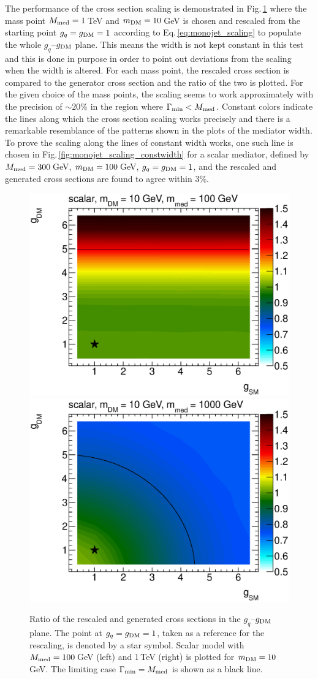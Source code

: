 The performance of the cross section scaling is demonstrated in Fig.\,\ref{fig:monojet_scaling} %
where the mass point $M_{\rm{med}}=1$\,TeV and $m_{\rm{DM}}=10$\,GeV is chosen
and rescaled from the starting point $g_q=g_{\rm{DM}}=1$ according to Eq.\,\ref{eq:monojet_scaling} to populate the whole $g_q$--$g_{\rm{DM}}$ plane. This means the width is not kept constant in this test and this is done in purpose in order to point out deviations from the scaling when the width is altered. For each mass point, the rescaled cross section is compared to the generator cross section and the ratio of the two is plotted.
For the given choice of the mass points, the scaling seems to work approximately with the precision of $\sim20\%$ in the region where $\Gamma_{\rm{min}}<M_{\rm{med}}$.
Constant colors indicate the lines along which the cross section scaling works precisely and there is a remarkable resemblance of the patterns shown in the plots of the mediator width. To prove the scaling along the lines of constant width works, one such line is chosen in Fig.\,\ref{fig:monojet_scaling_constwidth} for a scalar mediator, defined by $M_{\rm{med}}=300$\,GeV, $m_{\rm{DM}}=100$\,GeV, $g_q=g_{\rm{DM}}=1$, and the rescaled and generated cross sections are found to agree within 3\%.


\begin{figure}
\centering
\includegraphics[width=0.45\linewidth]{figures/monojet/scaling_S_10_100.eps}
\includegraphics[width=0.45\linewidth]{figures/monojet/scaling_S_10_1000.eps}\\
\caption{Ratio of the rescaled and generated cross sections in the $g_q$--$g_{\rm{DM}}$ plane. The point at $g_q=g_{\rm{DM}}=1$, taken as a reference for the rescaling, is denoted by a star symbol.
Scalar model with $M_{\rm{med}}=100$\,GeV (left) and 1\,TeV (right) is plotted for $m_{\rm{DM}}=10$\,GeV.
The limiting case $\Gamma_{\rm{min}}=M_{\rm{med}}$ is shown as a black line.}
\label{fig:monojet_scaling}
\end{figure}

